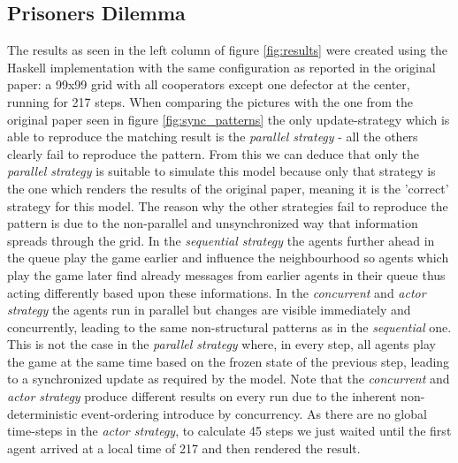 
\subsection{Prisoners Dilemma}
The results as seen in the left column of figure \ref{fig:results} were created using the Haskell implementation with the same configuration as reported in the original paper: a 99x99 grid with all cooperators except one defector at the center, running for 217 steps. When comparing the pictures with the one from the original paper seen in figure \ref{fig:sync_patterns} the only update-strategy which is able to reproduce the matching result is the \textit{parallel strategy} - all the others clearly fail to reproduce the pattern. From this we can deduce that only the \textit{parallel strategy} is suitable to simulate this model because only that strategy is the one which renders the results of the original paper, meaning it is the 'correct' strategy for this model. The reason why the other strategies fail to reproduce the pattern is due to the non-parallel and unsynchronized way that information spreads through the grid. In the \textit{sequential strategy} the agents further ahead in the queue play the game earlier and influence the neighbourhood so agents which play the game later find already messages from earlier agents in their queue thus acting differently based upon these informations. In the \textit{concurrent} and \textit{actor strategy} the agents run in parallel but changes are visible immediately and concurrently, leading to the same non-structural patterns as in the \textit{sequential} one. This is not the case in the \textit{parallel strategy}  where, in every step, all agents play the game at the same time based on the frozen state of the previous step, leading to a synchronized update as required by the model. Note that the \textit{concurrent} and \textit{actor strategy} produce different results on every run due to the inherent non-deterministic event-ordering introduce by concurrency. As there are no global time-steps in the \textit{actor strategy}, to calculate 45 steps we just waited until the first agent arrived at a local time of 217 and then rendered the result.

